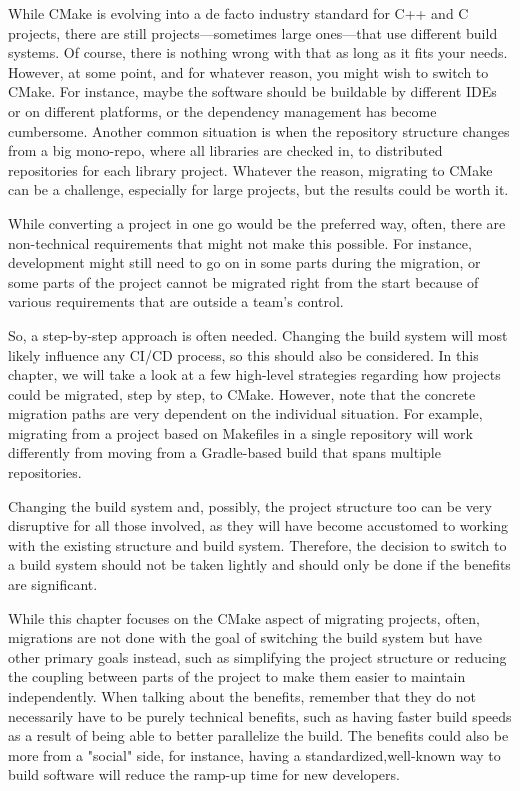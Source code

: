 While CMake is evolving into a de facto industry standard for C++ and C projects, there are still projects—sometimes large ones—that use different build systems. Of course, there is nothing wrong with that as long as it fits your needs. However, at some point, and for whatever reason, you might wish to switch to CMake. For instance, maybe the software should be buildable by different IDEs or on different platforms, or the dependency management has become cumbersome. Another common situation is when the repository structure changes from a big mono-repo, where all libraries are checked in, to distributed repositories for each library project. Whatever the reason, migrating to CMake can be a challenge, especially for large projects, but the results could be worth it.

While converting a project in one go would be the preferred way, often, there are non-technical requirements that might not make this possible. For instance, development might still need to go on in some parts during the migration, or some parts of the project cannot be migrated right from the start because of various requirements that are outside a team's control.

So, a step-by-step approach is often needed. Changing the build system will most likely influence any CI/CD process, so this should also be considered. In this chapter, we will take a look at a few high-level strategies regarding how projects could be migrated, step by step, to CMake. However, note that the concrete migration paths are very dependent on the individual situation. For example, migrating from a project based on Makefiles in a single repository will work differently from moving from a Gradle-based build that spans multiple repositories.

Changing the build system and, possibly, the project structure too can be very disruptive for all those involved, as they will have become accustomed to working with the existing structure and build system. Therefore, the decision to switch to a build system should not be taken lightly and should only be done if the benefits are significant.

While this chapter focuses on the CMake aspect of migrating projects, often, migrations are not done with the goal of switching the build system but have other primary goals instead, such as simplifying the project structure or reducing the coupling between parts of the project to make them easier to maintain independently. When talking about the benefits, remember that they do not necessarily have to be purely technical benefits, such as having faster build speeds as a result of being able to better parallelize the build. The benefits could also be more from a "social" side, for instance, having a standardized,well-known way to build software will reduce the ramp-up time for new developers.

